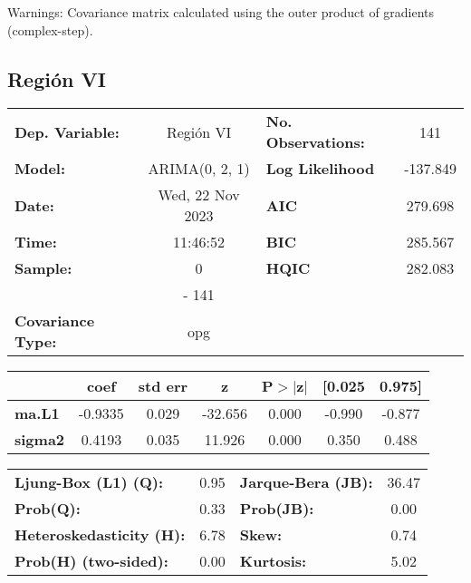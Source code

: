 \documentclass{article}%
\begin{document}
Warnings: \newline
 [1] Covariance matrix calculated using the outer product of gradients (complex-step).%
\subsection*{Región VI}%
\begin{center}
\begin{tabular}{lclc}
\toprule
\textbf{Dep. Variable:}          &    Región VI     & \textbf{  No. Observations:  } &    141      \\
\textbf{Model:}                  &  ARIMA(0, 2, 1)  & \textbf{  Log Likelihood     } &  -137.849   \\
\textbf{Date:}                   & Wed, 22 Nov 2023 & \textbf{  AIC                } &  279.698    \\
\textbf{Time:}                   &     11:46:52     & \textbf{  BIC                } &  285.567    \\
\textbf{Sample:}                 &        0         & \textbf{  HQIC               } &  282.083    \\
\textbf{}                        &       - 141      & \textbf{                     } &             \\
\textbf{Covariance Type:}        &       opg        & \textbf{                     } &             \\
\bottomrule
\end{tabular}
\begin{tabular}{lcccccc}
                & \textbf{coef} & \textbf{std err} & \textbf{z} & \textbf{P$> |$z$|$} & \textbf{[0.025} & \textbf{0.975]}  \\
\midrule
\textbf{ma.L1}  &      -0.9335  &        0.029     &   -32.656  &         0.000        &       -0.990    &       -0.877     \\
\textbf{sigma2} &       0.4193  &        0.035     &    11.926  &         0.000        &        0.350    &        0.488     \\
\bottomrule
\end{tabular}
\begin{tabular}{lclc}
\textbf{Ljung-Box (L1) (Q):}     & 0.95 & \textbf{  Jarque-Bera (JB):  } & 36.47  \\
\textbf{Prob(Q):}                & 0.33 & \textbf{  Prob(JB):          } &  0.00  \\
\textbf{Heteroskedasticity (H):} & 6.78 & \textbf{  Skew:              } &  0.74  \\
\textbf{Prob(H) (two-sided):}    & 0.00 & \textbf{  Kurtosis:          } &  5.02  \\
\bottomrule
\end{tabular}
\end{center}
\end{document}
